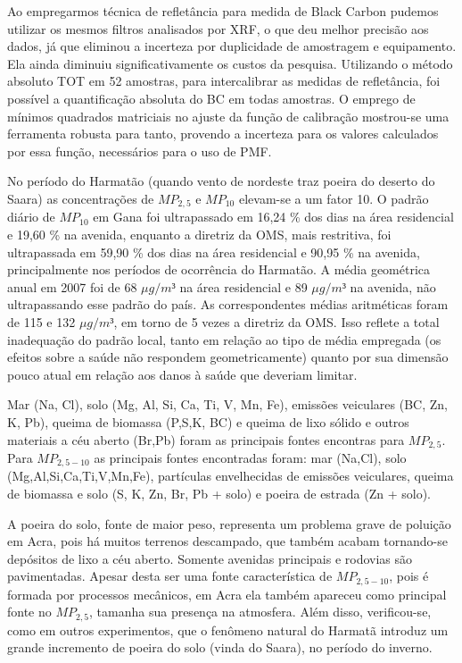 Ao empregarmos técnica de refletância para medida de Black Carbon pudemos utilizar os mesmos filtros analisados por XRF, o que deu melhor precisão aos dados, já que eliminou a incerteza por duplicidade de amostragem e equipamento. Ela ainda diminuiu significativamente os custos da pesquisa. Utilizando o método absoluto TOT em 52 amostras, para intercalibrar as medidas de refletância, foi possível a quantificação absoluta do BC em todas amostras. O emprego de mínimos quadrados matriciais no ajuste da função de calibração mostrou-se uma ferramenta robusta para tanto, provendo a incerteza para os valores calculados por essa função, necessários para o uso de PMF.

No período do Harmatão (quando vento de nordeste traz poeira do deserto do Saara) as concentrações de $MP_{2,5}$ e $MP_{10}$ elevam-se a um fator 10. O padrão diário de $MP_{10}$ em Gana foi ultrapassado em 16,24 \% dos dias na área residencial e 19,60 \% na avenida, enquanto a diretriz da OMS, mais restritiva, foi ultrapassada em 59,90 \% dos dias na área residencial e 90,95 \% na avenida, principalmente nos períodos de ocorrência do Harmatão. A média geométrica anual em 2007 foi de 68 $\mu g/m³$ na área residencial e 89 $\mu g/m³$ na avenida, não ultrapassando esse padrão do país. As correspondentes médias aritméticas foram de 115 e 132 $\mu g/m³$, em torno de 5 vezes a diretriz da OMS. Isso reflete a total inadequação do padrão local, tanto em relação ao tipo de média empregada (os efeitos sobre a saúde não respondem geometricamente) quanto por sua dimensão pouco atual em relação aos danos à saúde que deveriam limitar.

Mar (Na, Cl), solo (Mg, Al, Si, Ca, Ti, V, Mn, Fe), emissões veiculares (BC, Zn, K, Pb), queima de biomassa (P,S,K, BC) e queima de lixo sólido e outros materiais a céu aberto (Br,Pb) foram as principais fontes encontras para $MP_{2,5}$. Para $MP_{2,5-10}$ as principais fontes encontradas foram: mar (Na,Cl), solo (Mg,Al,Si,Ca,Ti,V,Mn,Fe), partículas envelhecidas de emissões veiculares, queima de biomassa e solo (S, K, Zn, Br, Pb + solo) e poeira de estrada (Zn + solo).

A poeira do solo, fonte de maior peso, representa um problema grave de poluição em Acra, pois há muitos terrenos descampado, que também acabam tornando-se depósitos de lixo a céu aberto. Somente avenidas principais e rodovias são pavimentadas. Apesar desta ser uma fonte característica de $MP_{2,5-10}$, pois é formada por processos mecânicos, em Acra ela também apareceu como principal fonte no $MP_{2,5}$, tamanha sua presença na atmosfera. Além disso, verificou-se, como em outros experimentos, que o fenômeno natural do Harmatã introduz um grande incremento de poeira do solo (vinda do Saara), no período do inverno.


